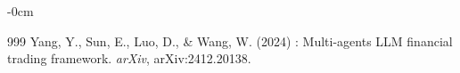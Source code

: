 \documentclass[jrfm,article,accept,moreauthors,pdftex]{Definitions/mdpi}
\begin{document}
\begin{adjustwidth}{-\extralength}{0cm}
\begin{thebibliography}{999}
Yang, Y., Sun, E., Luo, D., \& Wang, W. (2024)
: Multi-agents {LLM} financial trading framework.
\newblock \textit{arXiv}, arXiv:2412.20138.



\end{thebibliography}

\PublishersNote{}
\end{adjustwidth}
\end{document}
